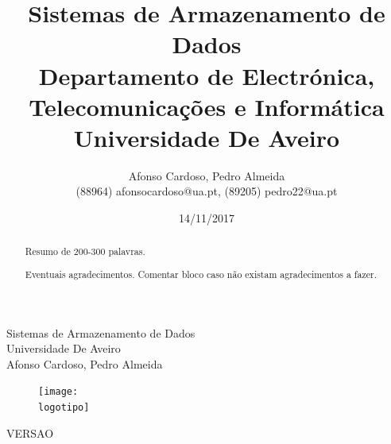 \documentclass{report}
\begin{document}
%
\def\titulo{Sistemas de Armazenamento de Dados}
\def\data{14/11/2017}
\def\autores{Afonso Cardoso, Pedro Almeida}
\def\autorescontactos{(88964) afonsocardoso@ua.pt, (89205) pedro22@ua.pt}
\def\versao{VERSAO}
\def\departamento{Departamento de Electrónica, Telecomunicações e Informática}
\def\empresa{Universidade De Aveiro}
\def\logotipo{ua.pdf}
%
%
\begin{titlepage}

\begin{center}
%
\vspace*{50mm}
%
{\Huge \titulo}\\ 
%
\vspace{10mm}
%
{\Large \empresa}\\
%
\vspace{10mm}
%
{\LARGE \autores}\\ 
%
\vspace{30mm}
%
\begin{figure}[h]
\center
\texttt{[image: \\logotipo]}
\end{figure}
%
\vspace{30mm}
\end{center}
%
\begin{flushright}
\versao
\end{flushright}
\end{titlepage}

\title{%
{\Huge\textbf{\titulo}}\\
{\Large \departamento\\ \empresa}
}
%
\author{%
    \autores \\
    \autorescontactos
}
%
\date{\data}
%
\maketitle


\begin{abstract}
Resumo de 200-300 palavras.
\end{abstract}

\renewcommand{\abstractname}{Agradecimentos}
\begin{abstract}
Eventuais agradecimentos.
Comentar bloco caso não existam agradecimentos a fazer.
\end{abstract}

\tableofcontents
\end{document}

